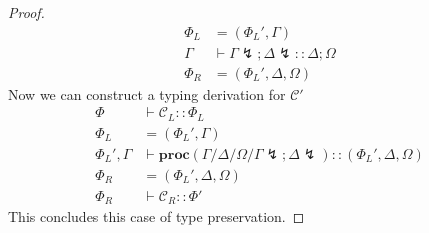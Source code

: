 \documentclass[12pt, openany]{memoir}
\newcommand*{\cancel}[1]{#1 \lightning}
\newcommand*{\procObj}[4]{\textbf{proc}(#1/#2/#3/#4)}
\newcommand*{\config}[0]{\mathcal{C}}
\begin{document}
\begin{proof}
\begin{align*}
      \Phi_L & = (\Phi_L', \Gamma) \\
      \Gamma & \vdash \cancel{\Gamma};\cancel{\Delta} :: \Delta; \Omega \\
      \Phi_R & = (\Phi_L', \Delta, \Omega)
    \end{align*}
    Now we can construct a typing derivation for $\config'$
    \begin{align*}
      \Phi & \vdash \config_L :: \Phi_L \\
      \Phi_L & = (\Phi_L', \Gamma) \\
      \Phi_L', \Gamma & \vdash \procObj{\Gamma}{\Delta}{\Omega}{\cancel{\Gamma};\cancel{\Delta}} :: (\Phi_L', \Delta, \Omega) \\
      \Phi_R & = (\Phi_L', \Delta, \Omega) \\
      \Phi_R & \vdash \config_R :: \Phi'
    \end{align*}
    This concludes this case of type preservation.
  
\end{proof}
\end{document}
